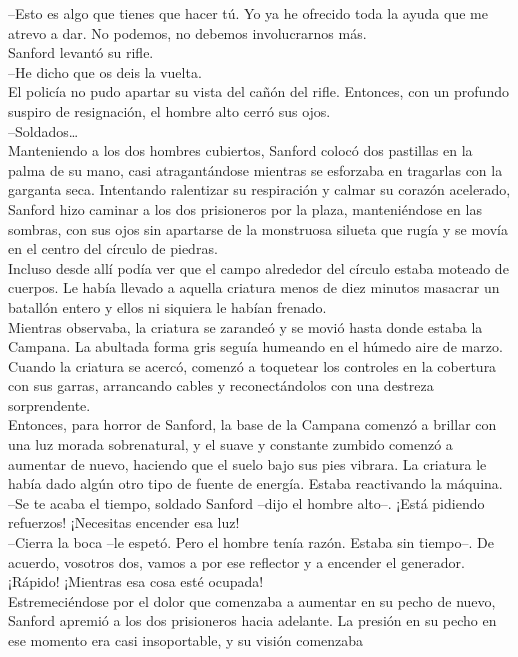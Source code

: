 --Esto es algo que tienes que hacer tú. Yo ya he ofrecido toda la ayuda
que me atrevo a dar. No podemos, no debemos involucrarnos más.\\
Sanford levantó su rifle.\\
--He dicho que os deis la vuelta. ~\\
El policía no pudo apartar su vista del cañón del rifle. Entonces, con
un profundo suspiro de resignación, el hombre alto cerró sus ojos.\\
--Soldados\ldots{}\\
Manteniendo a los dos hombres cubiertos, Sanford colocó dos pastillas en
la palma de su mano, casi atragantándose mientras se esforzaba en
tragarlas con la garganta seca. Intentando ralentizar su respiración y
calmar su corazón acelerado, Sanford hizo caminar a los dos prisioneros
por la plaza, manteniéndose en las sombras, con sus ojos sin apartarse
de la monstruosa silueta que rugía y se movía en el centro del círculo
de piedras.\\
Incluso desde allí podía ver que el campo alrededor del círculo estaba
moteado de cuerpos. Le había llevado a aquella criatura menos de diez
minutos masacrar un batallón entero y ellos ni siquiera le habían
frenado.\\
Mientras observaba, la criatura se zarandeó y se movió hasta donde
estaba la Campana. La abultada forma gris seguía humeando en el húmedo
aire de marzo. Cuando la criatura se acercó, comenzó a toquetear los
controles en la cobertura con sus garras, arrancando cables y
reconectándolos con una destreza sorprendente.\\
Entonces, para horror de Sanford, la base de la Campana comenzó a
brillar con una luz morada sobrenatural, y el suave y constante zumbido
comenzó a aumentar de nuevo, haciendo que el suelo bajo sus pies
vibrara. La criatura le había dado algún otro tipo de fuente de energía.
Estaba reactivando la máquina.\\
--Se te acaba el tiempo, soldado Sanford --dijo el hombre alto--. ¡Está
pidiendo refuerzos! ¡Necesitas encender esa luz!\\
--Cierra la boca --le espetó. Pero el hombre tenía razón. Estaba sin
tiempo--. De acuerdo, vosotros dos, vamos a por ese reflector y a
encender el generador. ¡Rápido! ¡Mientras esa cosa esté ocupada!\\
Estremeciéndose por el dolor que comenzaba a aumentar en su pecho de
nuevo, Sanford apremió a los dos prisioneros hacia adelante. La presión
en su pecho en ese momento era casi insoportable, y su visión comenzaba
